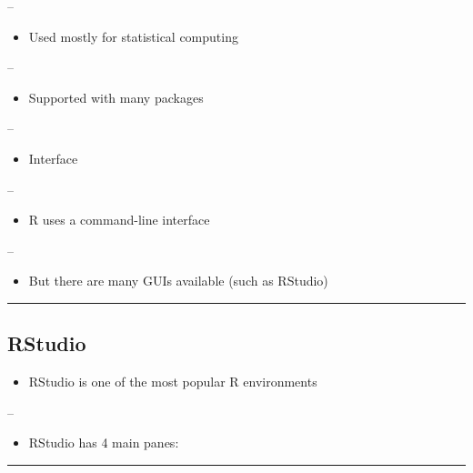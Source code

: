 \documentclass[]{article}
\providecommand{\tightlist}{%
  \setlength{\itemsep}{0pt}\setlength{\parskip}{0pt}}
\begin{document}
--

\begin{itemize}
\tightlist
\item
  Used mostly for statistical computing
\end{itemize}

--

\begin{itemize}
\tightlist
\item
  Supported with many packages
\end{itemize}

--

\begin{itemize}
\tightlist
\item
  Interface
\end{itemize}

--

\begin{itemize}
\tightlist
\item
  R uses a command-line interface
\end{itemize}

--

\begin{itemize}
\tightlist
\item
  But there are many GUIs available (such as RStudio)
\end{itemize}

\begin{center}\rule{0.5\linewidth}{\linethickness}\end{center}

\hypertarget{rstudio}{%
\subsection{RStudio}\label{rstudio}}

\begin{itemize}
\tightlist
\item
  RStudio is one of the most popular R environments
\end{itemize}

--

\begin{itemize}
\tightlist
\item
  RStudio has 4 main panes:
\end{itemize}

\begin{center}\rule{0.5\linewidth}{\linethickness}\end{center}
\end{document}
